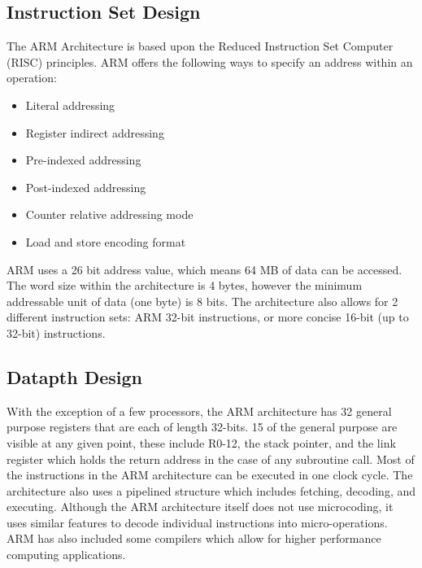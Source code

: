 \documentclass[draftclsnofoot, onecolumn, 10pt, compsoc]{IEEEtran}
\begin{document}
        \subsection{Instruction Set Design}
            The ARM Architecture is based upon the Reduced Instruction Set Computer (RISC) principles. ARM offers the following ways to specify an address within an operation:
            \begin{itemize}
                \item Literal addressing
                \item Register indirect addressing
                \item Pre-indexed addressing
                \item Post-indexed addressing
                \item Counter relative addressing mode
                \item Load and store encoding format
            \end{itemize}
            ARM uses a 26 bit address value, which means 64 MB of data can be accessed. 
            The word size within the architecture is 4 bytes, however the minimum addressable unit of data (one byte) is 8 bits. The architecture also allows for 2 different instruction sets: ARM 32-bit instructions, or more concise 16-bit (up to 32-bit) instructions. 
            ~\cite{ARM:Inside}
            ~\cite{ARM:Addressing}
            \cite{ARM:Thumb}

        \subsection{Datapth Design}
            With the exception of a few processors, the ARM architecture has 32 general purpose registers that are each of length 32-bits. 15 of the general purpose are visible at any given point, these include R0-12, the stack pointer, and the link register which holds the return address in the case of any subroutine call. Most of the instructions in the ARM architecture can be executed in one clock cycle. The architecture also uses a pipelined structure which includes fetching, decoding, and executing. Although the ARM architecture itself does not use microcoding, it uses similar features to decode individual instructions into micro-operations. ARM has also included some compilers which allow for higher performance computing applications. 
            ~\cite{ARM:Registers}
            ~\cite{ARM:Data}
            ~\cite{ARM:Instructions}
            ~\cite{ARM:HPC}
\end{document}
